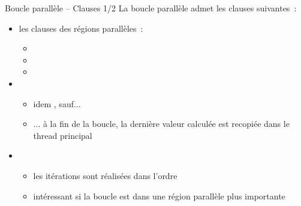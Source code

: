 \begin {frame} {Boucle parallèle -- Clauses 1/2}
    La boucle parallèle admet les clauses suivantes~:
    \begin {itemize}
	\item les clauses des régions parallèles~:

	    \begin {itemize}
		\item {}
		\item {}
		\item {}
	    \end {itemize}

	\item {}

	    \begin {itemize}
		\item idem , sauf...
		\item ... à la fin de la boucle, la dernière valeur
		    calculée est recopiée dans le thread principal

	    \end {itemize}

	\item {}

	    \begin {itemize}
		\item les itérations sont réalisées dans l'ordre
		\item intéressant si la boucle est dans une région
		    parallèle plus importante
	    \end {itemize}
    \end {itemize}
\end {frame}

